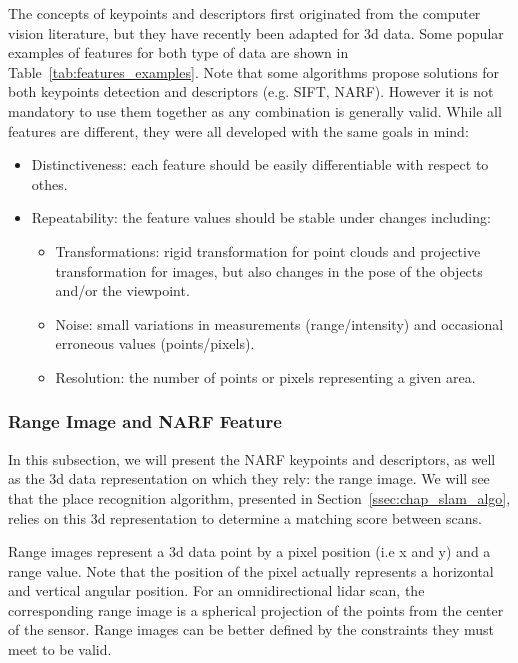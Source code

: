 The concepts of keypoints and descriptors first originated from the computer vision literature, but they have recently been adapted for \gls*{3d} data. Some popular examples of features for both type of data are shown in Table~\ref{tab:features_examples}. Note that some algorithms propose solutions for both keypoints detection and descriptors (e.g. SIFT, NARF). However it is not mandatory to use them together as any combination is generally valid. While all features are different, they were all developed with the same goals in mind:
\begin{itemize}[label=$\bullet$,noitemsep,topsep=0pt]
    \item Distinctiveness: each feature should be easily differentiable with respect to othes.
    \item Repeatability: the feature values should be stable under changes including:
        \begin{itemize}[label=$\circ$,noitemsep,topsep=0pt]
            \item Transformations: rigid transformation for point clouds and projective transformation for images, but also changes in the pose of the objects and/or the viewpoint.
            \item Noise: small variations in measurements (range/intensity) and occasional erroneous values (points/pixels).
            \item Resolution: the number of points or pixels representing a given area.
        \end{itemize}
\end{itemize}


\subsubsection{Range Image and NARF Feature}
\label{ssub:NARF Features and Range Image}

In this subsection, we will present the NARF keypoints and descriptors, as well as the \gls*{3d} data representation on which they rely: the range image. We will see that the place recognition algorithm, presented in Section~\ref{ssec:chap_slam_algo}, relies on this \gls*{3d} representation to determine a matching score between scans.

Range images represent a \gls*{3d} data point by a pixel position (i.e x and y) and a range value. Note that the position of the pixel actually represents a horizontal and vertical angular position. For an omnidirectional \gls*{lidar} scan, the corresponding range image is a spherical projection of the points from the center of the sensor. Range images can be better defined by the constraints they must meet to be valid. 

